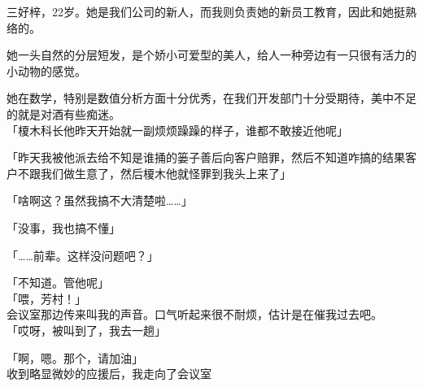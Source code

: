 三好梓，22岁。她是我们公司的新人，而我则负责她的新员工教育，因此和她挺熟络的。

她一头自然的分层短发，是个娇小可爱型的美人，给人一种旁边有一只很有活力的小动物的感觉。

她在数学，特别是数值分析方面十分优秀，在我们开发部门十分受期待，美中不足的就是对酒有些痴迷。\\

「榎木科长他昨天开始就一副烦烦躁躁的样子，谁都不敢接近他呢」

「昨天我被他派去给不知是谁捅的篓子善后向客户赔罪，然后不知道咋搞的结果客户不跟我们做生意了，然后榎木他就怪罪到我头上来了」

「啥啊这？虽然我搞不大清楚啦……」

「没事，我也搞不懂」

「……前辈。这样没问题吧？」

「不知道。管他呢」\\

「喂，芳村！」\\

会议室那边传来叫我的声音。口气听起来很不耐烦，估计是在催我过去吧。\\

「哎呀，被叫到了，我去一趟」

「啊，嗯。那个，请加油」\\

收到略显微妙的应援后，我走向了会议室\\

